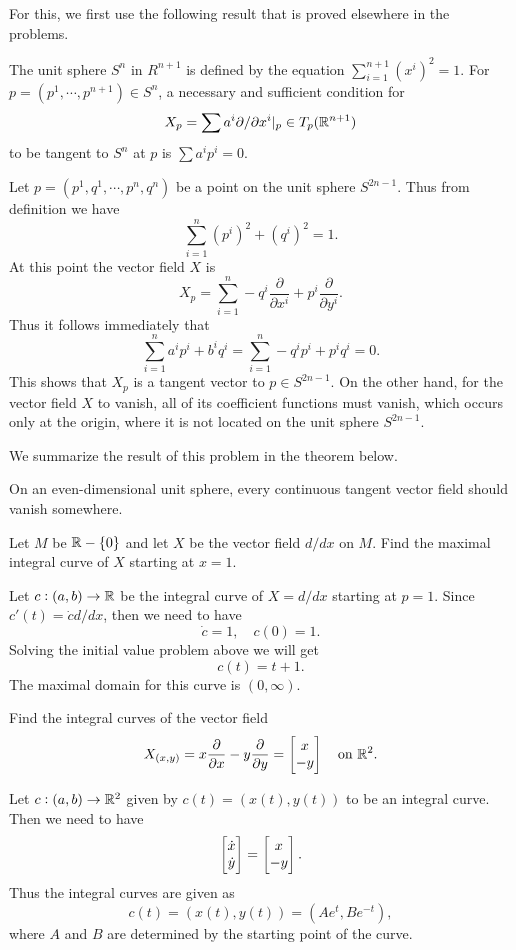 \begin{solution}
	For this, we first use the following result that is proved elsewhere in the problems.
	\begin{lemma}
		The unit sphere $ S^n $ in $ R^{n+1} $ is defined by the equation $ \sum_{i=1}^{n+1} (x^i)^2 = 1 $. For $ p = (p^1,\cdots,p^{n+1}) \in S^n $, a necessary and sufficient condition for 
		\[ X_p = \sum a^i \partial/\partial x^i|_{p} \in T_p(\mathbb{R}^{n+1})  \]
		to be tangent to $ S^n $ at $ p $ is $ \sum a^i p^i = 0 $.
	\end{lemma}
	Let $ p = (p^1,q^1,\cdots,p^n,q^n) $ be a point on the unit sphere $ S^{2n-1} $. Thus from definition we have
	\[ \sum_{i=1}^{n} (p^i)^2 + (q^i)^2 = 1. \]
	At this point the vector field $ X $ is
	\[ X_p = \sum_{i=1}^{n} - q^i \frac{\partial}{\partial x^i} + p^i \frac{\partial}{\partial y^i}. \]
	Thus it follows immediately that 
	\[ \sum_{i=1}^{n} a^i p^i + b^i q^i = \sum_{i=1}^{n} -q^i p^i + p^i q^i = 0.  \]
	This shows that $ X_p $ is a tangent vector to $ p \in S^{2n-1} $. On the other hand, for the vector field $ X $ to vanish, all of its coefficient functions must vanish, which occurs only at the origin, where it is not located on the unit sphere $ S^{2n-1} $.
	
	We summarize the result of this problem in the theorem below.
	\begin{theorem}
		On an even-dimensional unit sphere, every continuous tangent vector field should vanish somewhere.
	\end{theorem}
\end{solution}

\begin{problem}
	Let $ M $ be $ \mathbb{R} - \{0\} $ and let $ X $ be the vector field $ d/dx $ on $ M $. Find the maximal integral curve of $ X $ starting at $ x = 1 $.
\end{problem}
\begin{solution}
	Let $ c:(a,b) \to \mathbb{R} $ be the integral curve of $ X = d/dx $ starting at $ p = 1 $. Since $ c'(t) = \dot{c}d/dx $, then we need to have
	\[ \dot{c} = 1,\quad c(0) = 1. \]
	Solving the initial value problem above we will get
	\[ c(t) = t + 1. \]
	The maximal domain for this curve is $ (0,\infty) $.
\end{solution}

\begin{problem}
	Find the integral curves of the vector field
	\[ X_{(x,y)} = x\frac{\partial }{\partial x} - y\frac{\partial }{\partial y} = \begin{bmatrix} x \\ -y \end{bmatrix} \quad \text{on } \mathbb{R}^2. \]
\end{problem}
\begin{solution}
	Let $ c:(a,b) \to \mathbb{R}^2 $ given by $ c(t) = (x(t),y(t)) $ to be an integral curve. Then we need to have
	\[ \begin{bmatrix} \dot{x} \\ \dot{y} \end{bmatrix} = \begin{bmatrix} x \\ -y \end{bmatrix}. \]
	Thus the integral curves are given as
	\[ c(t) = (x(t),y(t)) = (Ae^{t},Be^{-t}), \]
	where $ A $ and $ B $ are determined by the starting point of the curve. 
\end{solution}

